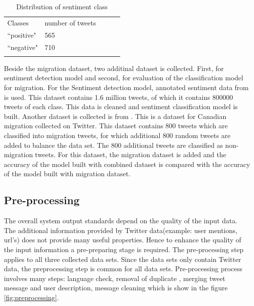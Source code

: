 \begin{table}[]
\centering
\begin{tabular}{lllll}
\cline{1-2}
\multicolumn{1}{|l|}{Classes}   & \multicolumn{1}{l|}{number of tweets} &  &  &  \\ \cline{1-2}
\multicolumn{1}{|l|}{``positive"} & \multicolumn{1}{l|}{565}  &  &  &  \\ \cline{1-2}
\multicolumn{1}{|l|}{``negative"}   & \multicolumn{1}{l|}{710}  &  &  &  \\ \cline{1-2}
                            &                           &  &  & 
\label{tab:Distribution of sentiment class}
\end{tabular}
\caption{Distribution of sentiment class}
\label{tab:DistsentimentClass}
\end{table}

Beside the migration dataset, two additinal dataset is collected. First, for sentiment detection model and second, for evaluation of the classification model for migration. For the Sentiment detection model, annotated sentiment data from \cite{stanford_data} is used. This dataset contains 1.6 million tweets, of which it contains  800000 tweets of each class. This data is cleaned and sentiment classification model is built. Another dataset is collected is from \cite{CanadianmMigrationDataset}. This is a dataset for Canadian migration collected on Twitter. This dataset contains 800 tweets which are classified into migration tweets, for which additional 800 random tweets are added to balance the data set. The 800 additional tweets are classified as non-migration tweets. For this dataset, the migration dataset is added and the accuracy of the model built with combined dataset is compared with the accuracy of the model built with migration dataset. 



\subsection{Pre-processing} \label{preprocessing}
The overall system output standards depend on the quality of the input data. The additional information provided by Twitter data(example: user mentions, url's) does not provide many useful properties. Hence to enhance the quality  of the input information a pre-preparing stage is required. The pre-processing step applies to all three collected data sets. Since the data sets only contain Twitter data, the preprocessing step is common for all data sets. Pre-processing process involves many steps: language check, removal of duplicate , merging tweet message and user description, message cleaning which is show in the figure \ref{fig:preprocessing}. 

